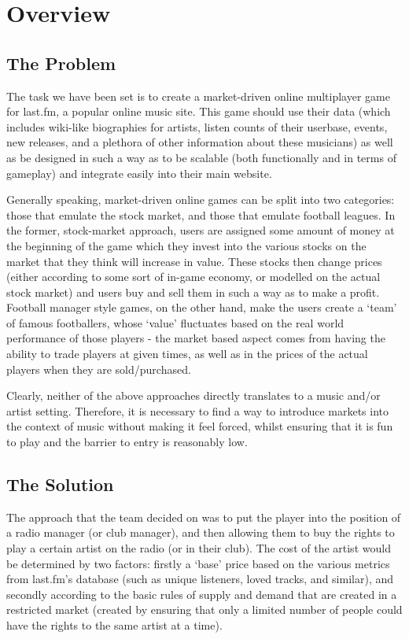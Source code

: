\documentclass[a4paper,10pt,twoside]{article}
\begin{document}
\section{Overview}
\subsection{The Problem}

The task we have been set is to create a market-driven online multiplayer game for last.fm, a popular online music site. This game should use their data (which includes wiki-like biographies for artists, listen counts of their userbase, events, new releases, and a plethora of other information about these musicians) as well as be designed in such a way as to be scalable (both functionally and in terms of gameplay) and integrate easily into their main website.

Generally speaking, market-driven online games can be split into two categories: those that emulate the stock market, and those that emulate football leagues. In the former, stock-market approach, users are assigned some amount of money at the beginning of the game which they invest into the various stocks on the market that they think will increase in value. These stocks then change prices (either according to some sort of in-game economy, or modelled on the actual stock market) and users buy and sell them in such a way as to make a profit. Football manager style games, on the other hand, make the users create a `team' of famous footballers, whose `value' fluctuates based on the real world performance of those players - the market based aspect comes from having the ability to trade players at given times, as well as in the prices of the actual players when they are sold/purchased.

Clearly, neither of the above approaches directly translates to a music and/or artist setting. Therefore, it is necessary to find a way to introduce markets into the context of music without making it feel forced, whilst ensuring that it is fun to play and the barrier to entry is reasonably low.

\subsection{The Solution}

The approach that the team decided on was to put the player into the position of a radio manager (or club manager), and then allowing them to buy the rights to play a certain artist on the radio (or in their club). The cost of the artist would be determined by two factors: firstly a `base' price based on the various metrics from last.fm's database (such as unique listeners, loved tracks, and similar), and secondly according to the basic rules of supply and demand that are created in a restricted market (created by ensuring that only a limited number of people could have the rights to the same artist at a time).
\end{document}
